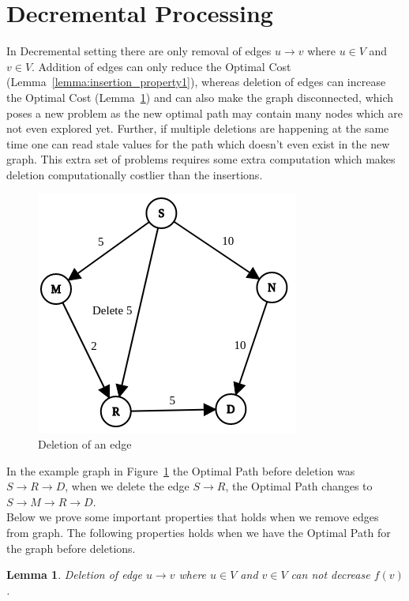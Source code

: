 \documentclass[a4paper]{article}
\newtheorem{lemma}[theorem]{Lemma}
\begin{document}
\section{Decremental Processing}\label{sec:decremental}
In Decremental setting there are only removal of edges $u \rightarrow v$ where $u \in V$ and $v \in V$. Addition of edges can only reduce the Optimal Cost (Lemma~\ref{lemma:insertion_property1}), whereas deletion of edges can increase the Optimal Cost (Lemma~\ref{lemma:deletion_prop1}) and can also make the graph disconnected, which poses a new problem as the new optimal path may contain many nodes which are not even explored yet. Further, if multiple deletions are happening at the same time one can read stale values for the path which doesn't even exist in the new graph. This extra set of problems requires some extra computation which makes deletion computationally costlier than the insertions.
\begin{figure}[H]
    \centering
    \includegraphics[scale=0.4]{img/Delete2.png}
    \caption{Deletion of an edge}
    \label{fig:delete_sample}
\end{figure}
In the example graph in Figure~\ref{fig:delete_sample} the Optimal Path before deletion was $S \rightarrow R \rightarrow D$, when we delete the edge $S \rightarrow R$, the Optimal Path changes to $S \rightarrow M \rightarrow R \rightarrow D$.\\
Below we prove some important properties that holds when we remove edges from graph. The following properties holds when we have the Optimal Path for the graph before deletions.
\begin{lemma}\label{lemma:deletion_prop1}
Deletion of edge $ u \rightarrow v$ where $u \in V$ and $v \in V$ can not decrease $f(v)$.
\end{lemma}
\end{document}
